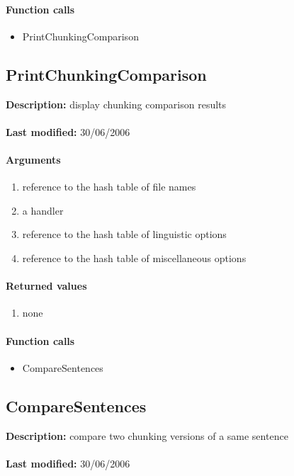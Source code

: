 \paragraph{Function calls}
\begin{itemize}
\item PrintChunkingComparison
\end{itemize}

\subsection{PrintChunkingComparison}
\textbf{Description:} display chunking comparison results\\
\\\textbf{Last modified:} 30/06/2006

\paragraph{Arguments}
\begin{enumerate}
\item reference to the hash table of file names
\item a handler
\item reference to the hash table of linguistic options
\item reference to the hash table of miscellaneous options
\end{enumerate}

\paragraph{Returned values}
\begin{enumerate}
\item none
\end{enumerate}

\paragraph{Function calls}
\begin{itemize}
\item CompareSentences
\end{itemize}

\subsection{CompareSentences}
\textbf{Description:} compare two chunking versions of a same sentence\\
\\\textbf{Last modified:} 30/06/2006

